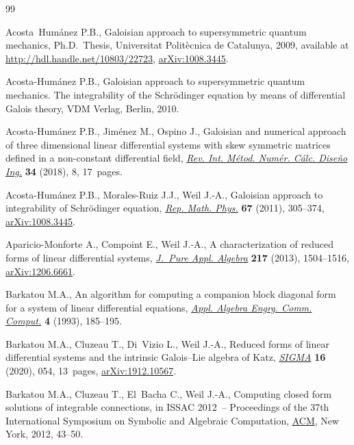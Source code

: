 \documentclass[pdftex]{sigma}%
\numberwithin{equation}{section}
\begin{document}
\begin{thebibliography}{99}
\footnotesize\itemsep=0pt

Acosta~Hum\'anez P.B., Galoisian approach to supersymmetric quantum mechanics,
 Ph.D.~Thesis, {U}niversitat Polit\`ecnica de Catalunya, 2009, available at
 \url{http://hdl.handle.net/10803/22723}, \href{https://arxiv.org/abs/1008.3445}{arXiv:1008.3445}.

Acosta-Hum\'anez P.B., Galoisian approach to supersymmetric quantum mechanics.
 The integrability of the Schr\"odinger equation by means of differential
 Galois theory, {VDM} Verlag, Berlin, 2010.

Acosta-Hum\'anez P.B., Jim\'enez M., Ospino J., Galoisian and numerical
 approach of three dimensional linear differential systems with skew symmetric
 matrices defined in a non-constant differential field, \href{https://doi.org/10.23967/j.rimni.2017.7.008}{\textit{Rev. Int.
 M\'etod. Num\'er. C\'alc. Dise\~no Ing.}} \textbf{34} (2018), 8, 17~pages.

Acosta-Hum\'anez P.B., Morales-Ruiz J.J., Weil J.-A., Galoisian approach to
 integrability of {S}chr\"odinger equation, \href{https://doi.org/10.1016/S0034-4877(11)60019-0}{\textit{Rep. Math. Phys.}}
 \textbf{67} (2011), 305--374, \href{https://arxiv.org/abs/1008.3445}{arXiv:1008.3445}.

Aparicio-Monforte A., Compoint E., Weil J.-A., A characterization of reduced
 forms of linear differential systems, \href{https://doi.org/10.1016/j.jpaa.2012.11.007}{\textit{J.~Pure Appl. Algebra}}
 \textbf{217} (2013), 1504--1516, \href{https://arxiv.org/abs/1206.6661}{arXiv:1206.6661}.

Barkatou M.A., An algorithm for computing a companion block diagonal form for a
 system of linear differential equations, \href{https://doi.org/10.1007/BF01202037}{\textit{Appl. Algebra Engrg. Comm.
 Comput.}} \textbf{4} (1993), 185--195.

Barkatou M.A., Cluzeau T., Di~Vizio L., Weil J.-A., Reduced forms of linear
 differential systems and the intrinsic {G}alois--{L}ie algebra of {K}atz,
 \href{https://doi.org/10.3842/SIGMA.2020.054}{\textit{SIGMA}} \textbf{16} (2020), 054, 13~pages, \href{https://arxiv.org/abs/1912.10567}{arXiv:1912.10567}.

Barkatou M.A., Cluzeau T., El~Bacha C., Weil J.-A., Computing closed form
 solutions of integrable connections, in I{SSAC} 2012~-- {P}roceedings of the
 37th {I}nternational {S}ymposium on {S}ymbolic and {A}lgebraic {C}omputation,
 \href{https://doi.org/10.1145/2442829.2442840}{ACM}, New York, 2012, 43--50.


\end{thebibliography}
\end{document}
